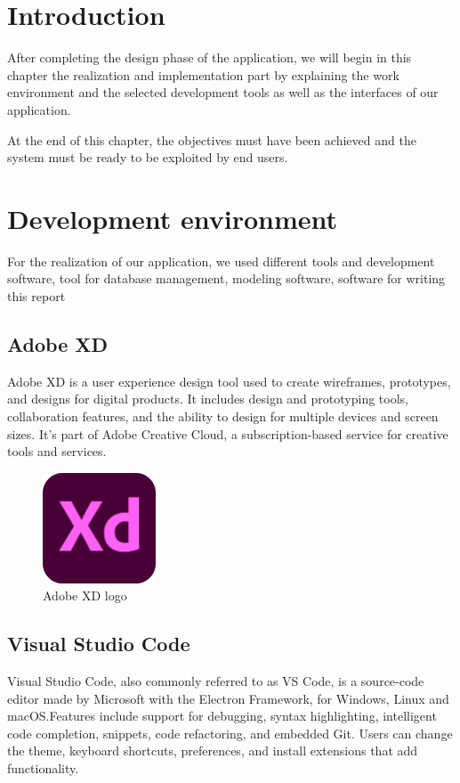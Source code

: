 \section{Introduction}
After completing the design phase of the application, we will begin in this chapter the realization and implementation part by explaining the work environment and the selected development tools as well as the interfaces of our application.

At the end of this chapter, the objectives must have been achieved and the system must be ready to be exploited by end users.




\section{Development environment}

For the realization of our application, we used different tools and development software, tool for database management, modeling software, software for writing this report


\subsection{Adobe XD}
Adobe XD is a user experience design tool used to create wireframes, prototypes, and designs for digital products. It includes design and prototyping tools, collaboration features, and the ability to design for multiple devices and screen sizes. It's part of Adobe Creative Cloud, a subscription-based service for creative tools and services. \cite{adobe}
\begin{figure}[H]
    \centering
    \includegraphics[width=0.3\textwidth]{images/Adobe_XD_CC_icon.svg.png}
    \caption{Adobe XD logo}
    \label{fig:figure4}
\end{figure}


\subsection{Visual Studio Code}
Visual Studio Code, also commonly referred to as VS Code, is a source-code editor made by Microsoft with the Electron Framework, for Windows, Linux and macOS.Features include support for debugging, syntax highlighting, intelligent code completion, snippets, code refactoring, and embedded Git. Users can change the theme, keyboard shortcuts, preferences, and install extensions that add functionality.

